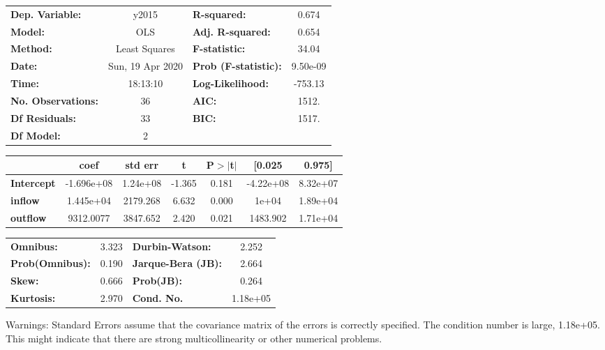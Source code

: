 \begin{center}
\begin{tabular}{lclc}
\toprule
\textbf{Dep. Variable:}    &      y2015       & \textbf{  R-squared:         } &     0.674   \\
\textbf{Model:}            &       OLS        & \textbf{  Adj. R-squared:    } &     0.654   \\
\textbf{Method:}           &  Least Squares   & \textbf{  F-statistic:       } &     34.04   \\
\textbf{Date:}             & Sun, 19 Apr 2020 & \textbf{  Prob (F-statistic):} &  9.50e-09   \\
\textbf{Time:}             &     18:13:10     & \textbf{  Log-Likelihood:    } &   -753.13   \\
\textbf{No. Observations:} &          36      & \textbf{  AIC:               } &     1512.   \\
\textbf{Df Residuals:}     &          33      & \textbf{  BIC:               } &     1517.   \\
\textbf{Df Model:}         &           2      & \textbf{                     } &             \\
\bottomrule
\end{tabular}
\begin{tabular}{lcccccc}
                   & \textbf{coef} & \textbf{std err} & \textbf{t} & \textbf{P$> |$t$|$} & \textbf{[0.025} & \textbf{0.975]}  \\
\midrule
\textbf{Intercept} &   -1.696e+08  &     1.24e+08     &    -1.365  &         0.181        &    -4.22e+08    &     8.32e+07     \\
\textbf{inflow}    &    1.445e+04  &     2179.268     &     6.632  &         0.000        &        1e+04    &     1.89e+04     \\
\textbf{outflow}   &    9312.0077  &     3847.652     &     2.420  &         0.021        &     1483.902    &     1.71e+04     \\
\bottomrule
\end{tabular}
\begin{tabular}{lclc}
\textbf{Omnibus:}       &  3.323 & \textbf{  Durbin-Watson:     } &    2.252  \\
\textbf{Prob(Omnibus):} &  0.190 & \textbf{  Jarque-Bera (JB):  } &    2.664  \\
\textbf{Skew:}          &  0.666 & \textbf{  Prob(JB):          } &    0.264  \\
\textbf{Kurtosis:}      &  2.970 & \textbf{  Cond. No.          } & 1.18e+05  \\
\bottomrule
\end{tabular}
\end{center}

Warnings: \newline
 [1] Standard Errors assume that the covariance matrix of the errors is correctly specified. \newline
 [2] The condition number is large, 1.18e+05. This might indicate that there are \newline
 strong multicollinearity or other numerical problems.